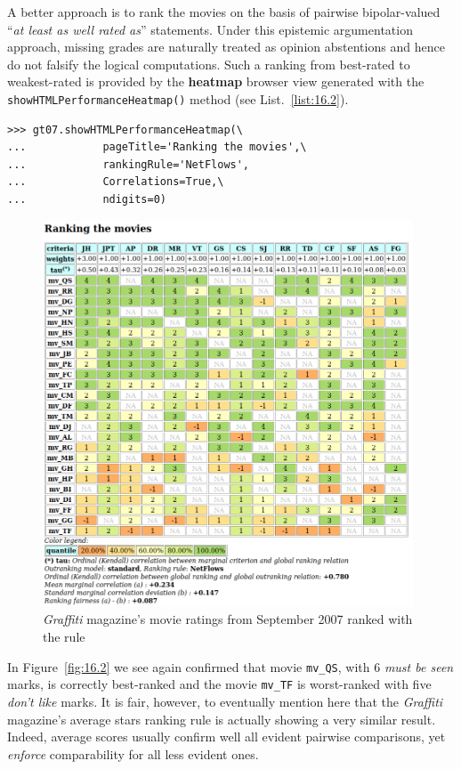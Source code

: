 A better approach is to rank the movies on the basis of pairwise bipolar-valued  ``\emph{at least as well rated as}'' statements. Under this epistemic argumentation approach, missing grades are naturally treated as opinion abstentions and hence do not falsify the logical computations. Such a \NetFlows ranking from best-rated to weakest-rated is provided by the \textbf{heatmap} browser view generated with the \texttt{showHTMLPerformanceHeatmap()} method (see List.~\vref{list:16.2}).
\begin{lstlisting}[caption={Showing the movie from best to worst rated in a heatmap view},label=list:16.2]
>>> gt07.showHTMLPerformanceHeatmap(\
...            pageTitle='Ranking the movies',\  
...            rankingRule='NetFlows',
...            Correlations=True,\
...            ndigits=0)
\end{lstlisting}
\begin{figure}[h]
\includegraphics[width=11cm]{Figures/graffiti07_2.png}
\caption{\emph{Graffiti} magazine's movie ratings from September 2007 ranked with the \NetFlows rule}
\label{fig:16.2}       %
\end{figure}

In Figure~\vref{fig:16.2} we see again confirmed that movie \texttt{mv\_QS}, with $6$ \emph{must be seen} marks, is correctly best-ranked and the movie \texttt{mv\_TF} is worst-ranked with five \emph{don't like} marks. 
It is fair, however, to eventually mention here that the \emph{Graffiti} magazine's average stars ranking rule is actually showing a very similar result. Indeed, average scores usually confirm well all evident pairwise comparisons, yet \emph{enforce} comparability for all less evident ones.

